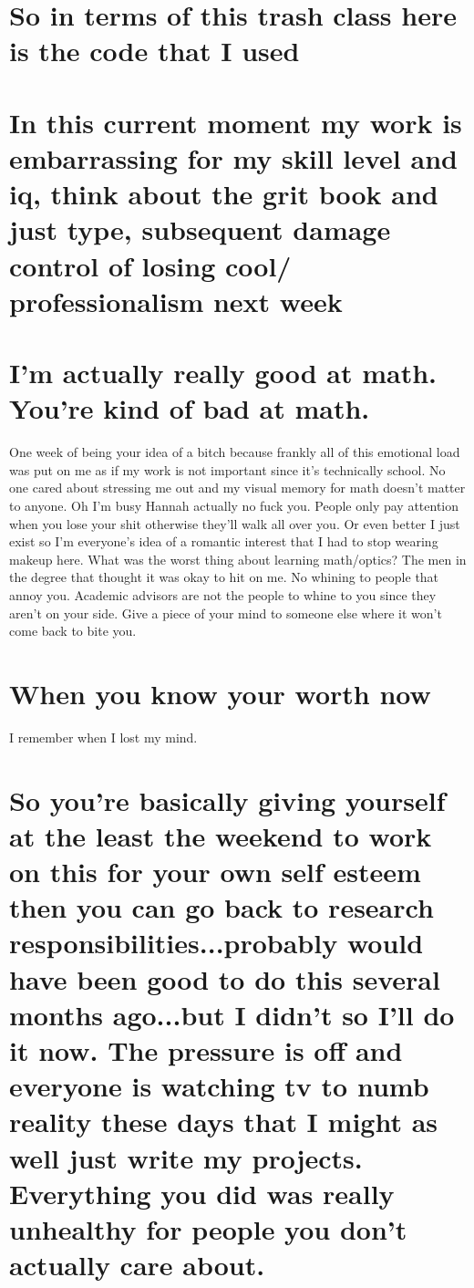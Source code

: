 \section{So in terms of this trash class here is the code that I used}

\section{In this current moment my work is embarrassing for my skill level and iq, think about the grit book and just type, subsequent damage control of losing cool/ professionalism next week}

\section{I'm actually really good at math. You're kind of bad at math.}

One week of being your idea of a bitch because frankly all of this emotional load was put on me as if my work is not important since it's technically school. No one cared about stressing me out and my visual memory for math doesn't matter to anyone. Oh I'm busy Hannah actually no fuck you. People only pay attention when you lose your shit otherwise they'll walk all over you. Or even better I just exist so I'm everyone's idea of a romantic interest that I had to stop wearing makeup here. What was the worst thing about learning math/optics? The men in the degree that thought it was okay to hit on me. No whining to people that annoy you. Academic advisors are not the people to whine to you since they aren't on your side. Give a piece of your mind to someone else where it won't come back to bite you.  

\section{When you know your worth now}
I remember when I lost my mind. 
\section{So you're basically giving yourself at the least the weekend to work on this for your own self esteem then you can go back to research responsibilities...probably would have been good to do this several months ago...but I didn't so I'll do it now. The pressure is off and everyone is watching tv to numb reality these days that I might as well just write my projects. Everything you did was really unhealthy for people you don't actually care about.}


